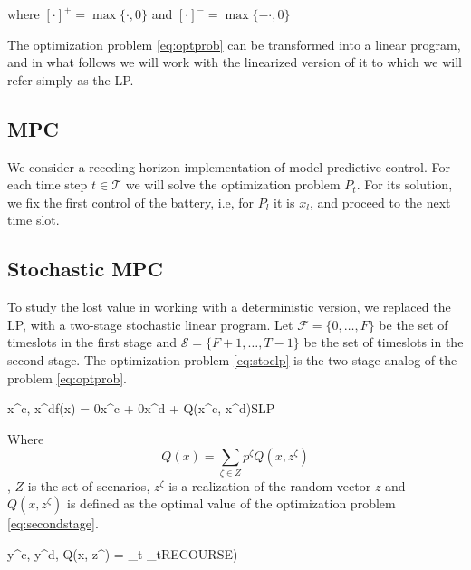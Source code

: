 \documentclass[11pt]{article}
\theoremstyle{definition}
\begin{document}
where $[\cdot]^+ = \max\{\cdot, 0\}$ and $[\cdot]^- = \max\{-\cdot, 0\}$

The optimization problem \eqref{eq:optprob} can be transformed into a linear program, and in what follows we will work with the linearized version of it to which we will refer simply as the LP.

\subsection{MPC}

We consider a receding horizon implementation of model predictive control. For each time step $t\in \mathcal{T}$ we will solve the optimization problem $P_t$. For its solution, we fix the first control of the battery, i.e, for $P_l$ it is $x_l$, and proceed to the next time slot. 


\subsection{Stochastic MPC}

To study the lost value in working with a deterministic version, we replaced the LP, with a two-stage stochastic linear program. Let $\mathcal{F} = \{0, \dots, F\}$ be the set of timeslots in the first stage and $\mathcal{S} = \{F+1, \dots, T-1 \}$ be the set of timeslots in the second stage. The optimization problem \eqref{eq:stoclp} is the two-stage analog of the problem \eqref{eq:optprob}.


\begin{mini!}[4]
	{x^c, x^d}{f(x) = 0x^c + 0x^d + Q(x^c, x^d)}{}{SLP}
  \label{eq:stoclp}
\end{mini!}


Where $$Q(x) = \sum_{\zeta \in Z} p^\zeta Q(x, z^\zeta)$$, $Z$ is the set of scenarios, $z^\zeta$ is a realization of the random vector $z$ and $Q(x, z^\zeta)$ is defined as the optimal value of the optimization problem \eqref{eq:secondstage}.

\begin{mini!}[1]
	{y^c, y^d, \alpha}{Q(x, z^\zeta) = \sum_{t \in {}} \alpha_t}{}{RECOURSE)}
	\label{eq:secondstage}
\end{mini!}
\end{document}
